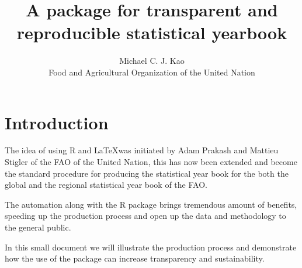 \documentclass{article}\usepackage{graphicx, color}
\makeatletter
\newenvironment{kframe}{%
 \def\at@end@of@kframe{}%
 \ifinner\ifhmode%
  \def\at@end@of@kframe{\end{minipage}}%
  \begin{minipage}{\columnwidth}%
 \fi\fi%
 \def\FrameCommand##1{\hskip\@totalleftmargin \hskip-\fboxsep
 \colorbox{shadecolor}{##1}\hskip-\fboxsep
     \hskip-\linewidth \hskip-\@totalleftmargin \hskip\columnwidth}%
 \MakeFramed {\advance\hsize-\width
   \@totalleftmargin\z@ \linewidth\hsize
   \@setminipage}}%
 {\par\unskip\endMakeFramed%
 \at@end@of@kframe}
\newenvironment{knitrout}{}{} %
\makeatother
\begin{document}
\title{\bf A package for transparent and reproducible statistical
  yearbook}
\author{Michael C. J. Kao\\ Food and Agricultural Organization of the
  United Nation}
\date{}

\maketitle
\tableofcontents





\begin{knitrout}
\color{fgcolor}\begin{kframe}


{\ttfamily\noindent\bfseries\color{errorcolor}{\#\# Error: there is no package called 'Rgraphviz'}}\end{kframe}
\end{knitrout}


\section{Introduction}
The idea of using R and \LaTeX was initiated by Adam Prakash and
Mattieu Stigler of the FAO of the United Nation, this has now been
extended and become the standard procedure for producing the
statistical year book for the both the global and the regional
statistical year book of the FAO.

The automation along with the R package brings tremendous amount of
benefits, speeding up the production process and open up the data and
methodology to the general public.

In this small document we will illustrate the production process and
demonstrate how the use of the package can increase transparency and
sustainability.
\end{document}
